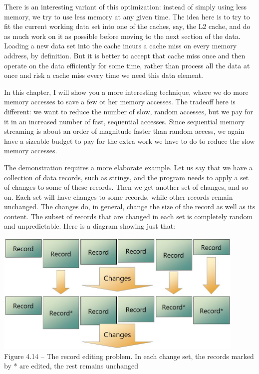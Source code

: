 There is an interesting variant of this optimization: instead of simply using less memory, we try to use less memory at any given time. The idea here is to try to fit the current working data set into one of the caches, say, the L2 cache, and do as much work on it as possible before moving to the next section of the data. Loading a new data set into the cache incurs a cache miss on every memory address, by definition. But it is better to accept that cache miss once and then operate on the data efficiently for some time, rather than process all the data at once and risk a cache miss every time we need this data element.

In this chapter, I will show you a more interesting technique, where we do more memory accesses to save a few ot her memory accesses. The tradeoff here is different: we want to reduce the number of slow, random accesses, but we pay for it in an increased number of fast, sequential accesses. Since sequential memory streaming is about an order of magnitude faster than random access, we again have a sizeable budget to pay for the extra work we have to do to reduce the slow memory accesses.

The demonstration requires a more elaborate example. Let us say that we have a collection of data records, such as strings, and the program needs to apply a set of changes to some of these records. Then we get another set of changes, and so on. Each set will have changes to some records, while other records remain unchanged. The changes do, in general, change the size of the record as well as its content. The subset of records that are changed in each set is completely random and unpredictable. Here is a diagram showing just that:

\begin{center}
\includegraphics[width=0.9\textwidth]{content/1/chapter4/images/14.jpg}\\
Figure 4.14 – The record editing problem. In each change set, the records marked by * are edited, the rest remains unchanged
\end{center}

